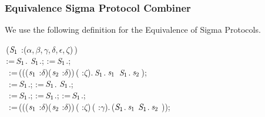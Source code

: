 \subsubsection{Equivalence Sigma Protocol Combiner}
We use the following definition for the Equivalence of Sigma Protocols.\\
\begin{holmath}
\,(\ensuremath{\HOLFreeVar{S}\sb{\mathrm{1}}} :(\ensuremath{\alpha},\,\ensuremath{\beta},\,\ensuremath{\gamma},\,\ensuremath{\delta},\,\ensuremath{\epsilon},\,\ensuremath{\zeta})\,)\,\HOLSymConst{=}\\
\HOLTokenLeftrec{}\,:=\,\ensuremath{\HOLFreeVar{S}\sb{\mathrm{1}}}.\,\HOLSymConst{\ensuremath{\times}}\,\ensuremath{\HOLFreeVar{S}\sb{\mathrm{1}}}.;\,\,:=\,\ensuremath{\HOLFreeVar{S}\sb{\mathrm{1}}}.;\\
\,\,\,:=\,(\HOLTokenLambda{}((\ensuremath{\HOLBoundVar{s}\sb{\mathrm{1}}} :\ensuremath{\delta})\HOLSymConst{,}(\ensuremath{\HOLBoundVar{s}\sb{\mathrm{2}}} :\ensuremath{\delta}))\,( :\ensuremath{\zeta}).\,\ensuremath{\HOLFreeVar{S}\sb{\mathrm{1}}}.\,\ensuremath{\HOLBoundVar{s}\sb{\mathrm{1}}}\,\,\HOLSymConst{\HOLTokenConj{}}\,\ensuremath{\HOLFreeVar{S}\sb{\mathrm{1}}}.\,\ensuremath{\HOLBoundVar{s}\sb{\mathrm{2}}}\,);\\
\,\,\,:=\,\ensuremath{\HOLFreeVar{S}\sb{\mathrm{1}}}.;\,\,:=\,\ensuremath{\HOLFreeVar{S}\sb{\mathrm{1}}}.\,\HOLSymConst{\ensuremath{\times}}\,\ensuremath{\HOLFreeVar{S}\sb{\mathrm{1}}}.;\\
\,\,\,:=\,\ensuremath{\HOLFreeVar{S}\sb{\mathrm{1}}}.;\,\,:=\,\ensuremath{\HOLFreeVar{S}\sb{\mathrm{1}}}.;\,\,:=\,\ensuremath{\HOLFreeVar{S}\sb{\mathrm{1}}}.;\\
\,\,\,:=\,(\HOLTokenLambda{}((\ensuremath{\HOLBoundVar{s}\sb{\mathrm{1}}} :\ensuremath{\delta})\HOLSymConst{,}(\ensuremath{\HOLBoundVar{s}\sb{\mathrm{2}}} :\ensuremath{\delta}))\,( :\ensuremath{\zeta})\,( :\ensuremath{\gamma}).\,(\ensuremath{\HOLFreeVar{S}\sb{\mathrm{1}}}.\,\ensuremath{\HOLBoundVar{s}\sb{\mathrm{1}}}\,\,\HOLSymConst{,}\ensuremath{\HOLFreeVar{S}\sb{\mathrm{1}}}.\,\ensuremath{\HOLBoundVar{s}\sb{\mathrm{2}}}\,\,));\\

\end{holmath}
